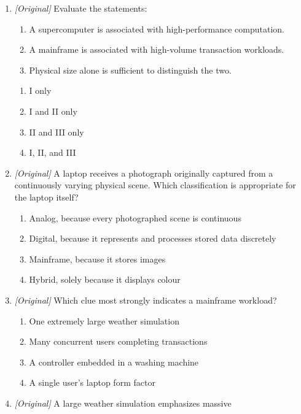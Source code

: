 \documentclass[11pt]{article}
\begin{document}
\begin{enumerate}[label=\textbf{Q\arabic*.}, leftmargin=*]
\begin{enumerate}[label=\Alph*.]
    \item Hybrid -- combines analog and digital characteristics
    \item Mainframe -- a signal representation
  \end{enumerate}
\item \textit{[Original]} Evaluate the statements:
  \begin{enumerate}[label=\Roman*.]
    \item A supercomputer is associated with high-performance computation.
    \item A mainframe is associated with high-volume transaction workloads.
    \item Physical size alone is sufficient to distinguish the two.
  \end{enumerate}
  \begin{enumerate}[label=\Alph*.]
    \item I only
    \item I and II only
    \item II and III only
    \item I, II, and III
  \end{enumerate}
\item \textit{[Original]} A laptop receives a photograph originally captured
  from a continuously varying physical scene. Which classification is
  appropriate for the laptop itself?
  \begin{enumerate}[label=\Alph*.]
    \item Analog, because every photographed scene is continuous
    \item Digital, because it represents and processes stored data discretely
    \item Mainframe, because it stores images
    \item Hybrid, solely because it displays colour
  \end{enumerate}
\item \textit{[Original]} Which clue most strongly indicates a mainframe
  workload?
  \begin{enumerate}[label=\Alph*.]
    \item One extremely large weather simulation
    \item Many concurrent users completing transactions
    \item A controller embedded in a washing machine
    \item A single user's laptop form factor
  \end{enumerate}
\item \textit{[Original]} A large weather simulation emphasizes massive

\end{enumerate}
\end{document}
